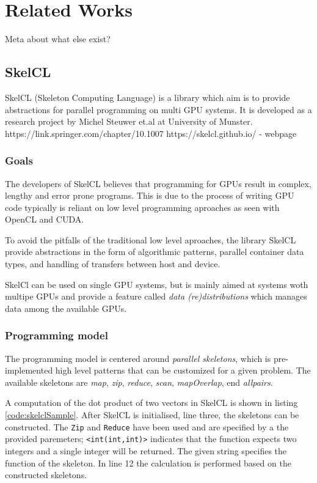 \section{Related Works}
Meta about what else exist?
 
\subsection{SkelCL}
SkelCL (Skeleton Computing Language) is a library which aim is to provide abstractions for parallel programming on multi GPU systems. It is developed as a research project by Michel Steuwer et.al at University of Munster.
https://link.springer.com/chapter/10.1007%
https://skelcl.github.io/ - webpage

\subsubsection{Goals}
The developers of SkelCL believes that programming for GPUs result in complex, lengthy and error prone programs. This is due to the process of writing GPU code typically is reliant on low level programming aproaches as seen with OpenCL and CUDA. 

To avoid the pitfalls of the traditional low level aproaches, the library SkelCL provide abstractions in the form of algorithmic patterns, parallel container data types, and handling of transfers between host and device. 

SkelCl can be used on single GPU systems, but is mainly aimed at systems woth multipe GPUs and provide a feature called \textit{data (re)distributions} which manages data among the available GPUs.

\subsubsection{Programming model}
The programming model is centered around \textit{parallel skeletons}, which is pre-implemented high level patterns that can be customized for a given problem. The available skeletons are \textit{map}, \textit{zip}, \textit{reduce}, \textit{scan}, \textit{mapOverlap}, end \textit{allpairs}.

A computation of the dot product of two vectors in SkelCL is shown in listing \ref{code:skelclSample}. After SkelCL is initialised, line three, the skeletons can be constructed. The \texttt{Zip} and \texttt{Reduce} have been used and are specified by a the provided paremeters; \texttt{<int(int,int)>} indicates that the function expects two integers and a single integer will be returned. The given string specifies the function of the skeleton. In line 12 the calculation is performed based on the constructed skeletons.

